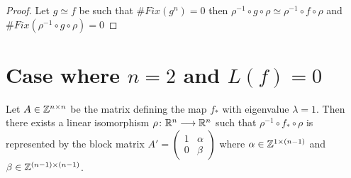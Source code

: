\documentclass[11pt,oneside,draft]{amsart}
\numberwithin{equation}{section} %
\numberwithin{figure}{section} %
\begin{document}
\begin{proof}
	Let $g\simeq f$ be such that $\#Fix(g^n)=0$ then $\rho^{-1}\circ g\circ \rho\simeq \rho^{-1}\circ f\circ \rho$ and $\#Fix(\rho^{-1}\circ g\circ \rho)=0$

\end{proof}
\section*{Case where \texorpdfstring{$n=2$}{n} and \texorpdfstring{$L(f)=0$}{L(f)}} 

\begin{lem}\label{nice_form}
	Let $ A\in \mathbb{Z}^{n\times n}$  be the matrix defining the map $f_*$ with eigenvalue $\lambda=1$. Then there exists a linear isomorphism $\rho  \colon \mathbb{R}^n\longrightarrow\mathbb{R}^n$ such that $\rho ^{-1} \circ f_* \circ \rho$ is represented by the block matrix $ A'= \left( \begin{array}{ccc}
1 & \alpha  \\
0 & \beta  \end{array} \right)$ where $\alpha\in \mathbb{Z}^{1\times (n-1)}$ and $ \beta \in \mathbb{Z}^{(n-1)\times (n-1)}$.
\end{lem}
\end{document}
